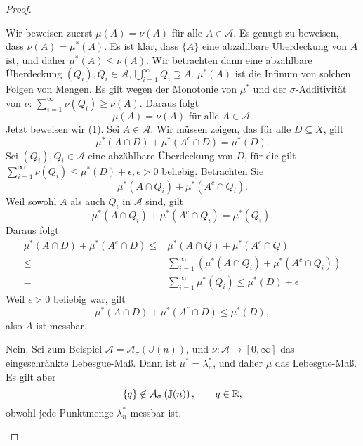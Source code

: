 \begin{proof}
	\begin{parts}
	\item Wir beweisen zuerst $\mu(A)=\nu(A)$ f\"{u}r alle $A\in \mathcal{A}$. Es genugt zu beweisen, dass $\nu(A)=\mu^*(A)$. Es ist klar, dass $\{A\}$ eine abzählbare Überdeckung von $A$ ist, und daher $\mu^*(A)\le \nu(A)$. Wir betrachten dann eine abzählbare Überdeckung $(Q_i),Q_i\in \mathcal{A},\bigcup_{i=1}^\infty Q_i\supseteq A $. $\mu^*(A)$ ist die Infinum von solchen Folgen von Mengen. Es gilt wegen der Monotonie von $\mu^*$ und der $\sigma$-Additivität von $\nu$: $\sum_{i=1}^{\infty} \nu(Q_i)\ge \nu(A)$. Daraus folgt
		\[
			\mu(A)=\nu(A)\text{ f\"{u}r alle }A\in \mathcal{A}
		.\] 
		Jetzt beweisen wir (1). Sei $A\in \mathcal{A}$. Wir müssen zeigen, das f\"{u}r alle $D\subseteq X$, gilt
		\[
			\mu^*(A\cap D)+\mu^*(A^c\cap D)=\mu^*(D)
		.\] 
		Sei $(Q_i),Q_i\in\mathcal{A}$ eine abzählbare Überdeckung von $D$, f\"{u}r die gilt $\sum_{i=1}^{\infty} \nu(Q_i)\le \mu^*(D)+\epsilon, \epsilon>0$ beliebig.  Betrachten Sie
		\[
			\mu^*(A\cap Q_i)+\mu^*(A^c\cap Q_i)
		.\] 
		Weil sowohl $A$ als auch  $Q_i$ in $\mathcal{A}$ sind, gilt
		\[
			\mu^*(A\cap Q_i)+\mu^*(A^c\cap Q_i)=\mu^*(Q_i)
		.\] 
		Daraus folgt
	\begin{align*}
		\mu^*(A\cap D)+\mu^*(A^c\cap D)\le& \mu^*(A\cap Q)+\mu^*(A^c\cap Q)\\
		\le& \sum_{i=1}^{\infty} \left( \mu^*(A\cap Q_i)+\mu^*(A^c\cap Q_i) \right)\\
		=&\sum_{i=1}^{\infty} \mu^*(Q_i)\le\mu^*(D)+\epsilon
		\end{align*}
		Weil $\epsilon>0$ beliebig war, gilt
		\[
		\mu^*(A\cap D)+\mu^*(A^c\cap D)\le \mu^*(D)
		,\] 
		also $A$ ist messbar.
	\item Nein. Sei zum Beispiel $\mathcal{A}=\mathcal{A}_\sigma\left(\mathbb{J}(n)\right)$, und $\nu:\mathcal{A}\to [0,\infty]$ das eingeschränkte Lebesgue-Maß. Dann ist $\mu^*=\lambda_n^*$, und daher $\mu$ das Lebesgue-Maß. Es gilt aber
		\[
			\left\{ q \right\} \not\in \mathcal{A}_\sigma\left( \mathbb{J}(n) \right), \qquad q\in \mathbb{R}
		,\] 
		obwohl jede Punktmenge $\lambda_n^*$ messbar ist.\qedhere
	\end{parts}
\end{proof}
